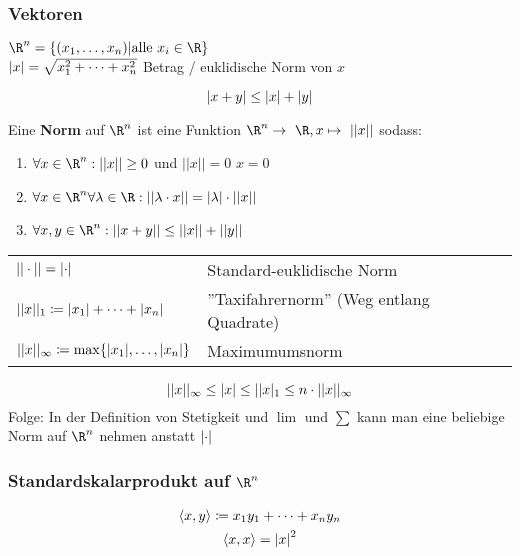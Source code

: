 \subsubsection{Vektoren}
$\R^n = \{ (x_1 , \dotsc , x_n) | \text{alle } x_i \in \R \}$\\
$\abs{x} = \sqrt{x_1^2 + \dots + x_n^2}$ Betrag / euklidische Norm von $x$\\
\begin{satz*}[note = Dreiecksungleichung]
	\[ \abs{x+y} \leq \abs{x} + \abs{y} \]
\end{satz*}
\begin{def*}[note = Norm , index = Norm]
	Eine \textbf{Norm} auf $\R^n$ ist eine Funktion $\R^n \rightarrow \R , x \mapsto ||x||$ sodass:
	\begin{enumerate}
		\item $\forall x \in \R^n : ||x|| \geq 0$ und $||x|| = 0$ \gdw $x=0$
		\item $\forall x \in \R^n \forall \lambda \in \R: ||\lambda \cdot x|| = \abs{\lambda} \cdot ||x||$
		\item $\forall x , y \in \R^n : ||x + y|| \leq ||x|| + ||y||$
	\end{enumerate}
\end{def*}
\begin{bsp*}
	\begin{tabular}{ll}
		$||\cdot|| = \abs{\cdot}$								&Standard-euklidische Norm			\\
		$||x||_1 \coloneqq \abs{x_1} + \dots + \abs{x_n}$				&''Taxifahrernorm'' (Weg entlang Quadrate)	\\
		$||x||_\infty \coloneqq \max\{ \abs{x_1}, \dotsc , \abs{x_n} \}$	&Maximumumsnorm					
	\end{tabular}
\end{bsp*}
\begin{fakt}
	\[ ||x||_\infty \leq \abs{x} \leq ||x|_1 \leq n \cdot ||x||_\infty \]
	Folge: In der Definition von Stetigkeit und $\lim$ und $\sum$ kann man eine beliebige Norm auf $\R^n$ nehmen anstatt $\abs{\cdot}$
\end{fakt}

\subsubsection{Standardskalarprodukt auf $\R^n$}
\begin{gather*}
	\langle x,y \rangle \coloneqq x_1 y_1 + \dots + x_n y_n \\
	\langle x,x \rangle = \abs{x}^2
\end{gather*}
